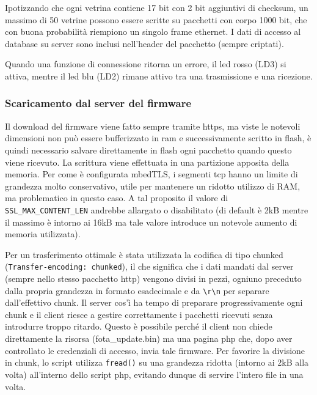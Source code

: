 Ipotizzando che ogni vetrina contiene 17 bit con 2 bit aggiuntivi di checksum, un massimo di 50 vetrine possono essere scritte su pacchetti con corpo 1000 bit, che con buona probabilit\`a riempiono un singolo frame ethernet. I dati di accesso al database su server sono inclusi nell'header del pacchetto (sempre criptati).

Quando una funzione di connessione ritorna un errore, il led rosso (LD3) si attiva, mentre il led blu (LD2) rimane attivo tra una trasmissione e una ricezione.

\subsubsection{Scaricamento dal server del firmware}


Il download del firmware viene fatto sempre tramite https, ma viste le notevoli dimensioni non pu\`o essere bufferizzato in ram e successivamente scritto in flash, \`e quindi necessario salvare direttamente in flash ogni pacchetto quando questo viene ricevuto. La scrittura viene effettuata in una partizione apposita della memoria. Per come \`e configurata mbedTLS, i segmenti tcp hanno un limite di grandezza molto conservativo, utile per mantenere un ridotto utilizzo di RAM, ma problematico in questo caso. A tal proposito il valore di \texttt{SSL\_MAX\_CONTENT\_LEN} andrebbe allargato o disabilitato (di default \`e 2kB mentre il massimo \`e intorno ai 16kB ma tale valore introduce un notevole aumento di memoria utilizzata). 

Per un trasferimento ottimale \`e stata utilizzata la codifica di tipo chunked (\texttt{Transfer-encoding: chunked}), il che significa che i dati mandati dal server (sempre nello stesso pacchetto http) vengono divisi in pezzi, ogniuno preceduto dalla propria grandezza in formato esadecimale e da \texttt{\textbackslash{r}\textbackslash{n}} per separare dall'effettivo chunk. Il server cos'\`i ha tempo di preparare progressivamente ogni chunk e il client riesce a gestire correttamente i pacchetti ricevuti senza introdurre troppo ritardo. Questo \`e possibile perch\'e il client non chiede direttamente la risorsa (fota\_update.bin) ma una pagina php che, dopo aver controllato le credenziali di accesso, invia tale firmware. Per favorire la divisione in chunk, lo script utilizza \texttt{fread()} su una grandezza ridotta (intorno ai 2kB alla volta) all'interno dello script php, evitando dunque di servire l'intero file in una volta.

